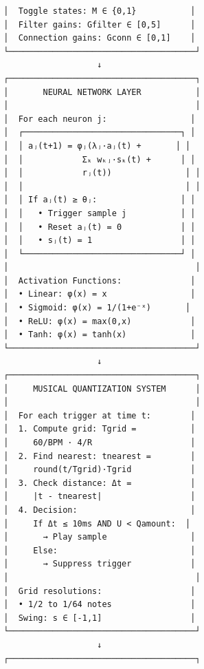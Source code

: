 \documentclass[11pt,a4paper]{article}
\begin{document}
\begin{figure}[h]
\begin{verbatim}
              │  Toggle states: M ∈ {0,1}           │
              │  Filter gains: Gfilter ∈ [0,5]      │
              │  Connection gains: Gconn ∈ [0,1]    │
              └──────────────────────────────────────┘
                                 ↓
              ┌──────────────────────────────────────┐
              │       NEURAL NETWORK LAYER           │
              │                                      │
              │  For each neuron j:                 │
              │  ┌────────────────────────────────┐ │
              │  │ aⱼ(t+1) = φⱼ(λⱼ·aⱼ(t) +       │ │
              │  │            Σₖ wₖⱼ·sₖ(t) +      │ │
              │  │            rⱼ(t))               │ │
              │  │                                 │ │
              │  │ If aⱼ(t) ≥ θⱼ:                 │ │
              │  │   • Trigger sample j           │ │
              │  │   • Reset aⱼ(t) = 0            │ │
              │  │   • sⱼ(t) = 1                  │ │
              │  └────────────────────────────────┘ │
              │                                      │
              │  Activation Functions:              │
              │  • Linear: φ(x) = x                 │
              │  • Sigmoid: φ(x) = 1/(1+e⁻ˣ)       │
              │  • ReLU: φ(x) = max(0,x)            │
              │  • Tanh: φ(x) = tanh(x)             │
              └──────────────────────────────────────┘
                                 ↓
              ┌──────────────────────────────────────┐
              │     MUSICAL QUANTIZATION SYSTEM      │
              │                                      │
              │  For each trigger at time t:        │
              │  1. Compute grid: Tgrid =           │
              │     60/BPM · 4/R                    │
              │  2. Find nearest: tnearest =        │
              │     round(t/Tgrid)·Tgrid            │
              │  3. Check distance: Δt =            │
              │     |t - tnearest|                  │
              │  4. Decision:                       │
              │     If Δt ≤ 10ms AND U < Qamount:  │
              │       → Play sample                 │
              │     Else:                           │
              │       → Suppress trigger            │
              │                                      │
              │  Grid resolutions:                  │
              │  • 1/2 to 1/64 notes                │
              │  Swing: s ∈ [-1,1]                  │
              └──────────────────────────────────────┘
                                 ↓
              ┌──────────────────────────────────────┐

\end{verbatim}
\end{figure}
\end{document}
